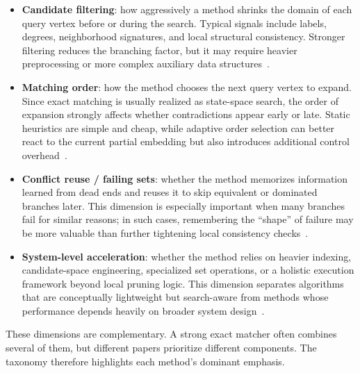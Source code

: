\begin{itemize}
  \item \textbf{Candidate filtering}: how aggressively a method shrinks the domain of each query vertex before or during the search. Typical signals include labels, degrees, neighborhood signatures, and local structural consistency. Stronger filtering reduces the branching factor, but it may require heavier preprocessing or more complex auxiliary data structures~\cite{he2008graphql,sun2020study}.

  \item \textbf{Matching order}: how the method chooses the next query vertex to expand. Since exact matching is usually realized as state-space search, the order of expansion strongly affects whether contradictions appear early or late. Static heuristics are simple and cheap, while adaptive order selection can better react to the current partial embedding but also introduces additional control overhead~\cite{han2019daf,sun2020study}.

  \item \textbf{Conflict reuse / failing sets}: whether the method memorizes information learned from dead ends and reuses it to skip equivalent or dominated branches later. This dimension is especially important when many branches fail for similar reasons; in such cases, remembering the ``shape'' of failure may be more valuable than further tightening local consistency checks~\cite{han2019daf,arai2023gup}.

  \item \textbf{System-level acceleration}: whether the method relies on heavier indexing, candidate-space engineering, specialized set operations, or a holistic execution framework beyond local pruning logic. This dimension separates algorithms that are conceptually lightweight but search-aware from methods whose performance depends heavily on broader system design~\cite{he2008graphql,sun2021rapidmatch}.
\end{itemize}

These dimensions are complementary. A strong exact matcher often combines several of them, but different papers prioritize different components. The taxonomy therefore highlights each method's dominant emphasis.

